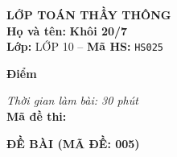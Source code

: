 \noindent
\begin{tcolorbox}[colback=white,colframe=black,arc=0mm,boxrule=0.8pt,top=4pt,bottom=4pt,left=6pt,right=6pt]
	\begin{minipage}[c]{0.44\textwidth}
		{\bfseries\large LỚP TOÁN THẦY THÔNG}\\[3pt]
		\textbf{Họ và tên:} \textbf{\large Khôi 20/7}\\[3pt]
		\textbf{Lớp:} LỚP 10 \quad -- \quad \textbf{Mã HS:} \texttt{HS025}
	\end{minipage}
	\hfill
	\begin{minipage}[c]{0.22\textwidth}
		\begin{tcolorbox}[colback=white,colframe=black,arc=0mm,boxrule=0.6pt,height=1.8cm,halign=center,valign=top,top=2pt]
			{\bfseries\normalsize Điểm}
		\end{tcolorbox}
	\end{minipage}
	\hfill
	\begin{minipage}[c]{0.30\textwidth}
		\raggedleft
		\textit{Thời gian làm bài: 30 phút}\\[4pt]
		\textbf{Mã đề thi:} 
	\end{minipage}
\end{tcolorbox}
\vspace{0.25cm}

\noindent\textbf{\large ĐỀ BÀI (MÃ ĐỀ: 005)}
\vspace{0.1cm}


